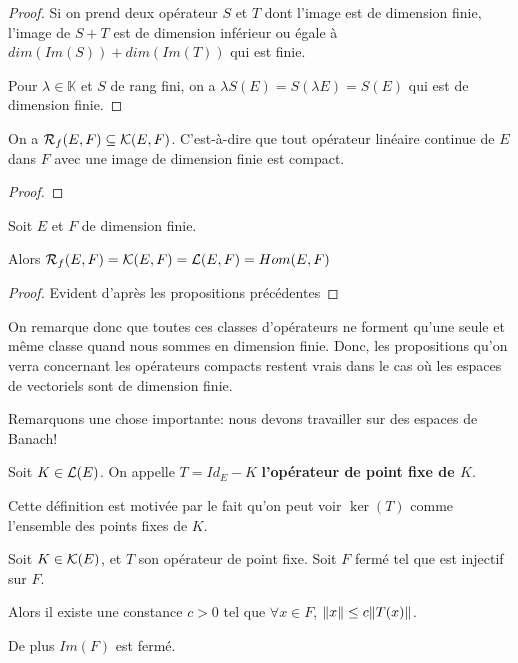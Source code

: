 \begin{proof}
	Si on prend deux opérateur $S$ et $T$ dont l'image est de dimension finie,
	l'image de $S + T$ est de dimension inférieur ou égale à $dim(Im(S)) +
	dim(Im(T))$ qui est finie.

	Pour $\lambda \in \mathbb{K}$ et $S$ de rang fini, on a $\lambda S(E) =
	S(\lambda E) = S(E)$ qui est de dimension finie.
\end{proof}

\begin{proposition}
	On a $\mathcal{R}_{f}(E, F) \subseteq \mathcal{K}(E, F)$. C'est-à-dire
	que tout opérateur linéaire continue de $E$ dans $F$ avec une image de
	dimension finie est compact.
\end{proposition}

\begin{proof}
	
\end{proof}

\begin{proposition}
	Soit $E$ et $F$ de dimension finie.
	
	Alors $\mathcal{R}_{f}(E, F) = \mathcal{K}(E, F) =
	\mathcal{L}(E, F) = Hom(E, F)$
\end{proposition}

\begin{proof}
	Evident d'après les propositions précédentes
\end{proof}

On remarque donc que toutes ces classes d'opérateurs ne forment qu'une seule et
même classe quand nous sommes en dimension finie. Donc, les propositions qu'on
verra concernant les opérateurs compacts restent vrais dans le cas où les
espaces de vectoriels sont de dimension finie.

Remarquons une chose importante: nous devons travailler sur des espaces de
Banach!


\begin{definition} 
	Soit $K \in \mathcal{L}(E)$. On appelle $T = Id_{E} - K$
	\textbf{l'opérateur de point fixe de $K$}.
	
	Cette définition est motivée par le fait qu'on peut voir $\ker(T)$ comme
	l'ensemble des points fixes de $K$.
\end{definition}

\begin{proposition}
	\label{prop:fixe_point_closed_injective}
	Soit $K \in \mathcal{K}(E)$, et $T$ son opérateur de point fixe. Soit $F$
	fermé tel que  est injectif sur $F$.

	Alors il existe une constance $c > 0$ tel que $\forall x \in F$, $\norm{x}
	\leq c \norm{T(x)}$.

	De plus $Im(F)$ est fermé.
\end{proposition}

